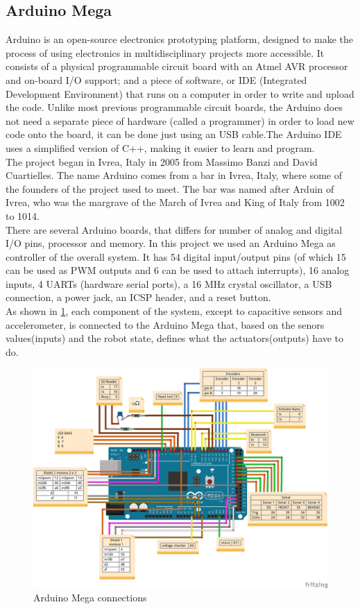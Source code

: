 \subsection{Arduino Mega}
Arduino is an open-source electronics prototyping platform, designed to make the process of using electronics in multidisciplinary projects more accessible\cite{arduino:intro}. 
It consists of a physical programmable circuit board with an Atmel AVR processor and on-board I/O support; and a piece of software, or IDE (Integrated Development Environment) that runs on a computer in order to write and upload the code.
Unlike most previous programmable circuit boards, the Arduino does not need a separate piece of hardware (called a programmer) in order to load new code onto the board, it can be done just using an USB cable.The Arduino IDE uses a simplified version of C++, making it easier to learn and program.\\
The project began in Ivrea, Italy in 2005 from Massimo Banzi and David Cuartielles.
The name Arduino comes from a bar in Ivrea, Italy, where some of the founders of the project used to meet. The bar was named after Arduin of Ivrea, who was the margrave of the March of Ivrea and King of Italy from 1002 to 1014\cite{lahart2014taking}.\\
There are several Arduino boards, that differs for number of analog and digital I/O pins, processor and memory.
In this project we used an Arduino Mega as controller of the overall system. It has 54 digital input/output pins (of which 15 can be used as PWM outputs and 6 can be used to attach interrupts), 16 analog inputs, 4 UARTs (hardware serial ports), a 16 MHz crystal oscillator, a USB connection, a power jack, an ICSP header, and a reset button\cite{arduino:mega}.\\
As shown in \ref{megaConnections}, each component of the system, except to capacitive sensors and accelerometer, is connected to the Arduino Mega that, based on the senors values(inputs) and the robot state, defines what the actuators(outputs) have to do.
\begin{figure}[h]
	\centering
	\includegraphics[width=1\textwidth]{TeoG2_bb}
	\caption{Arduino Mega connections}
	\label{megaConnections}
\end{figure}
